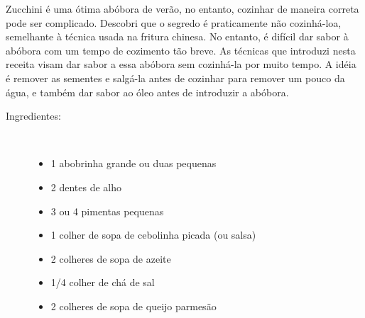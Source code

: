 \documentclass[11pt,letterpaper]{article}
\begin{document}


Zucchini é uma ótima abóbora de verão, no entanto, cozinhar de maneira correta pode ser complicado. Descobri que o segredo é praticamente não cozinhá-loa, semelhante à técnica usada na fritura chinesa. No entanto, é difícil dar sabor à abóbora com um tempo de cozimento tão breve. As técnicas que introduzi nesta receita visam dar sabor a essa abóbora sem cozinhá-la por muito tempo. A idéia é remover as sementes e salgá-la antes de cozinhar para remover um pouco da água, e também  dar sabor ao óleo antes de introduzir a abóbora.

\begin {description}

\item [Ingredientes:] \ \\
\begin {itemize}
\item 1 abobrinha grande ou duas pequenas
\item 2 dentes de alho
\item 3 ou 4 pimentas pequenas
\item 1 colher de sopa de cebolinha picada (ou salsa)
\item 2 colheres de sopa de azeite
\item 1/4 colher de chá de sal
\item 2 colheres de sopa de queijo parmesão
\end {itemize}


\end{description}
\end{document}
